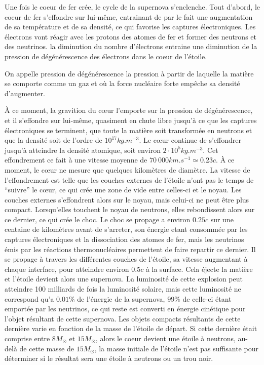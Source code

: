 \documentclass[11pt]{book} %
\begin{document}
Une fois le coeur de fer crée, le cycle de la supernova s'enclenche. Tout d'abord, le coeur de fer s'effondre sur lui-même, entrainant de par le fait une augmentation de sa température et de sa densité, ce qui favorise les captures électroniques. Les électrons vont réagir avec les protons des atomes de fer et former des neutrons et des neutrinos. la diminution du nombre d'électrons entraine une diminution de la pression de dégénérescence des électrons dans le coeur de l'étoile.\n

\begin{definition}
    On appelle pression de dégénérescence la pression à partir de laquelle la matière se comporte comme un gaz et où la force nucléaire forte empêche sa densité d'augmenter.
\end{definition}

À ce moment, la gravition du c{\oe}ur l'emporte sur la pression de dégénérescence, et il s'effondre sur lui-même, quasiment en chute libre jusqu'à ce que les captures électroniques se terminent, que toute la matière soit transformée en neutrons et que la densité soit de l'ordre de \(10^{17}kg.m^{-3}\). Le c{\oe}ur continue de s'effondrer jusqu'à atteindre la densité atomique, soit environ \(2\cdot 10^5kg.m^{-3}\). Cet effondrement ce fait à une vitesse moyenne de \(70\ 000km.s^{-1}\simeq 0.23c\). À ce moment, le c{\oe}ur ne mesure que quelques kilomètres de diamètre.\n
La vitesse de l'effondrement est telle que les couches externes de l'étoile n'ont pas le temps de ``suivre'' le c{\oe}ur, ce qui crée une zone de vide entre celles-ci et le noyau. Les couches externes s'effondrent alors sur le noyau, mais celui-ci ne peut être plus compact. Lorsqu'elles touchent le noyau de neutrons, elles rebondissent alors sur ce dernier, ce qui crée le choc.\n
Le choc se propage a environ \(0.25c\) sur une centaine de kilomètres avant de s'arreter, son énergie etant consommée par les captures électroniques et la dissociation des atomes de fer, mais les neutrinos émis par les réactions thermonucléaires permettent de faire repartir ce dernier. Il se propage à travers les différentes couches de l'étoile, sa vitesse augmentant à chaque interface, pour atteindre environ \(0.5c\) à la surface. Cela éjecte la matière et l'étoile devient alors une supernova.\n
La luminosité de cette explosion peut atteindre 100 milliards de fois la luminosité solaire, mais cette luminosité ne correspond qu'a \(0.01\%\) de l'énergie de la supernova, \(99\%\) de celle-ci étant emportée par les neutrinos, ce qui reste est converti en énergie cinétique pour l'objet résultant de cette supernova.\n
Les objets compacts résultants de cette dernière varie en fonction de la masse de l'étoile de départ. Si cette dernière était comprise entre \(8M_\odot\) et \(15M_\odot\), alors le coeur devient une étoile à neutrons, au-delà de cette masse de \(15M_\odot\), la masse initiale de l'étoile n'est pas suffisante pour déterminer si le résultat sera une étoile à neutrons ou un trou noir.
\end{document}
